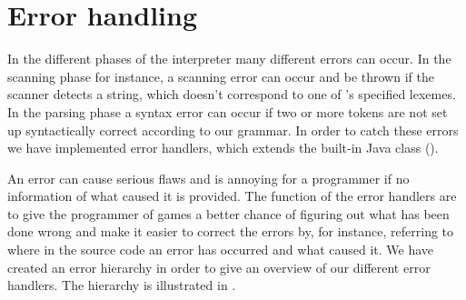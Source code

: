 \section{Error handling}
\label{sec:errorhandling}

In the different phases of the interpreter many different errors can occur.
In the scanning phase for instance, a scanning error can occur and be
thrown if the scanner detects a string, which doesn't correspond to one
of \productname{}'s specified lexemes. In the parsing phase a syntax
error can occur if two or more tokens are not set up syntactically
correct according to our grammar. In order to catch these errors we
have implemented error handlers, which extends the built-in Java class
 ().

An error can cause serious flaws and is annoying for a programmer if no
information of what caused it is provided. The function of the error
handlers are to give the programmer of \productname{} games a better chance of
figuring out what has been done wrong and make it easier to correct the errors
by, for instance, referring to where in the source code an error has occurred and
what caused it. We have created an error hierarchy in order to give an overview
of our different error handlers. The hierarchy is illustrated in
. 



